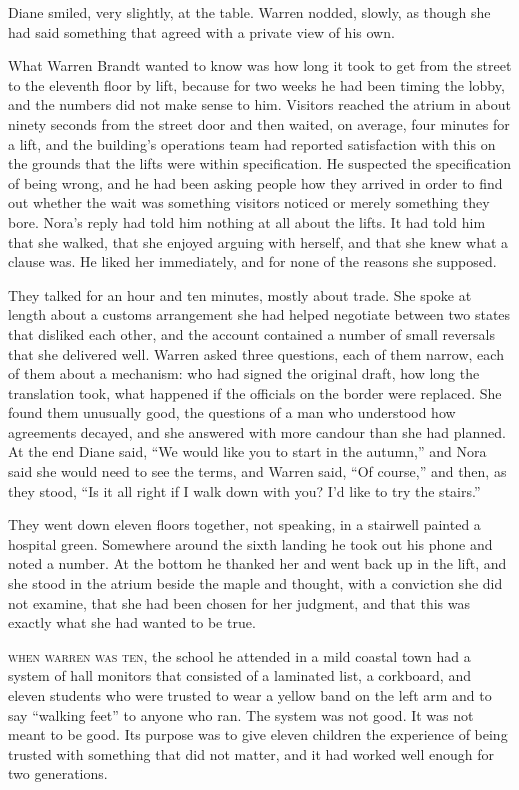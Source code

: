Diane smiled, very slightly, at the table. Warren nodded, slowly, as though she had said something that agreed with a private view of his own.

What Warren Brandt wanted to know was how long it took to get from the street to the eleventh floor by lift, because for two weeks he had been timing the lobby, and the numbers did not make sense to him. Visitors reached the atrium in about ninety seconds from the street door and then waited, on average, four minutes for a lift, and the building's operations team had reported satisfaction with this on the grounds that the lifts were within specification. He suspected the specification of being wrong, and he had been asking people how they arrived in order to find out whether the wait was something visitors noticed or merely something they bore. Nora's reply had told him nothing at all about the lifts. It had told him that she walked, that she enjoyed arguing with herself, and that she knew what a clause was. He liked her immediately, and for none of the reasons she supposed.

They talked for an hour and ten minutes, mostly about trade. She spoke at length about a customs arrangement she had helped negotiate between two states that disliked each other, and the account contained a number of small reversals that she delivered well. Warren asked three questions, each of them narrow, each of them about a mechanism: who had signed the original draft, how long the translation took, what happened if the officials on the border were replaced. She found them unusually good, the questions of a man who understood how agreements decayed, and she answered with more candour than she had planned. At the end Diane said, ``We would like you to start in the autumn,'' and Nora said she would need to see the terms, and Warren said, ``Of course,'' and then, as they stood, ``Is it all right if I walk down with you? I'd like to try the stairs.''

They went down eleven floors together, not speaking, in a stairwell painted a hospital green. Somewhere around the sixth landing he took out his phone and noted a number. At the bottom he thanked her and went back up in the lift, and she stood in the atrium beside the maple and thought, with a conviction she did not examine, that she had been chosen for her judgment, and that this was exactly what she had wanted to be true.


\textsc{when warren was ten,} the school he attended in a mild coastal town had a system of hall monitors that consisted of a laminated list, a corkboard, and eleven students who were trusted to wear a yellow band on the left arm and to say ``walking feet'' to anyone who ran. The system was not good. It was not meant to be good. Its purpose was to give eleven children the experience of being trusted with something that did not matter, and it had worked well enough for two generations.

